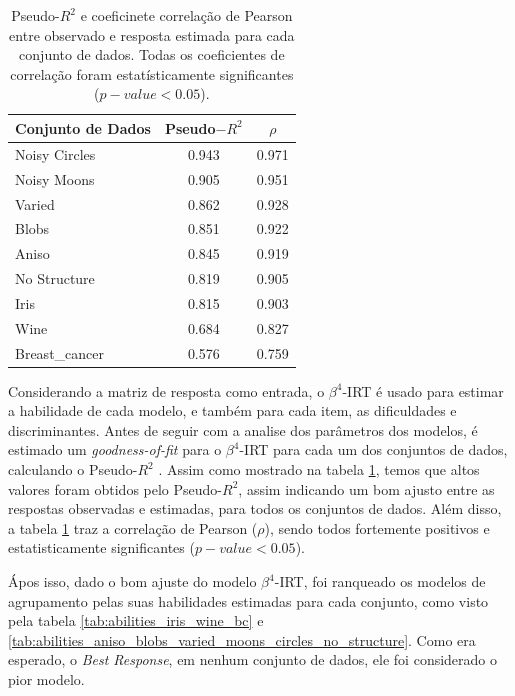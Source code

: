 \begin{table}[!htbp]
    \centering
    \caption{Pseudo-$R^2$ \cite{ferreirajunior2023beta4irtnewbeta3irtenhanced} e coeficinete correlação de Pearson entre observado e resposta estimada para cada conjunto de dados. Todas os coeficientes de correlação foram estatísticamente significantes ($p-value < 0.05$).}
    \begin{tabular}{lcc}
    \toprule
    Conjunto de Dados & Pseudo$-R^{2}$ & $\rho$ \\
    \midrule
    Noisy Circles & 0.943 & 0.971 \\
    Noisy Moons & 0.905 & 0.951 \\
    Varied & 0.862 & 0.928 \\
    Blobs & 0.851 & 0.922 \\
    Aniso & 0.845 & 0.919 \\
    No Structure & 0.819 & 0.905 \\
    Iris & 0.815 & 0.903 \\
    Wine & 0.684 & 0.827 \\
    Breast\_cancer & 0.576 & 0.759 \\
    \bottomrule
    \end{tabular}
    \label{tab:pseudor2_results}
\end{table}


Considerando a matriz de resposta como entrada, o $\beta^4$-\gls{IRT} é usado para estimar a habilidade de cada modelo, e também para cada item, as dificuldades e discriminantes. Antes de seguir com a analise dos parâmetros dos modelos, é estimado um \textit{goodness-of-fit} para o $\beta^4$-\gls{IRT} para cada um dos conjuntos de dados, calculando o Pseudo-$R^2$ \cite{ferreirajunior2023beta4irtnewbeta3irtenhanced}. Assim como mostrado na tabela \ref{tab:pseudor2_results}, temos que altos valores foram obtidos pelo Pseudo-$R^2$, assim indicando  um bom ajusto entre as respostas observadas e estimadas, para todos os conjuntos de dados. Além disso, a tabela \ref{tab:pseudor2_results} traz a correlação de Pearson ($\rho$), sendo todos fortemente positivos e estatisticamente significantes ($p-value < 0.05$).

Ápos isso, dado o bom ajuste do modelo $\beta^4$-\gls{IRT}, foi ranqueado os modelos de agrupamento pelas suas habilidades estimadas para cada conjunto, como visto pela tabela  \ref{tab:abilities_iris_wine_bc} e \ref{tab:abilities_aniso_blobs_varied_moons_circles_no_structure}. Como era esperado, o \textit{Best Response}, em nenhum conjunto de dados, ele foi considerado o pior modelo.



